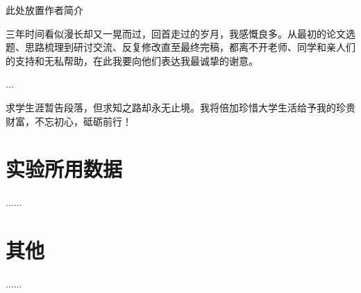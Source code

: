 \documentclass[oneside,a4paper,12pt,AutoFakeBold]{book}%
\begin{document}
\jluPrintReference



\begin{jluSelfIntroduction}
此处放置作者简介
\end{jluSelfIntroduction}



\begin{jluAcknowledgment}
三年时间看似漫长却又一晃而过，回首走过的岁月，我感慨良多。从最初的论文选题、思路梳理到研讨交流、反复修改直至最终完稿，都离不开老师、同学和亲人们的支持和无私帮助，在此我要向他们表达我最诚挚的谢意。

...

求学生涯暂告段落，但求知之路却永无止境。我将倍加珍惜大学生活给予我的珍贵财富，不忘初心，砥砺前行！
\end{jluAcknowledgment}

\appendix
\begin{appendices}
	\chapter{实验所用数据}
	......
	\chapter{其他}
	......
\end{appendices}
\end{document}
